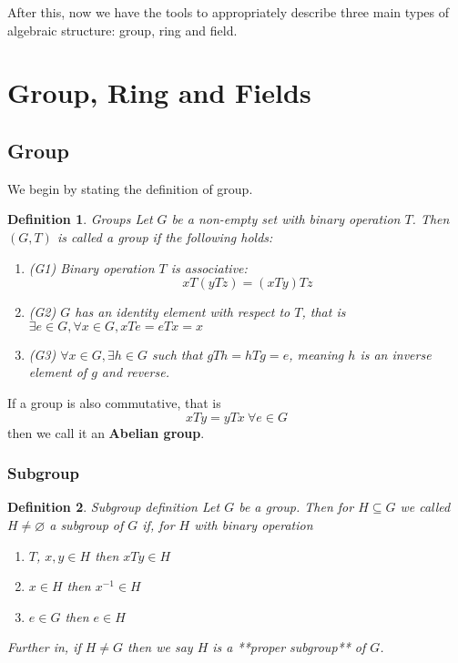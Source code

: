 \documentclass{book}
\newtheorem{Definition}{Definition}[section]
\numberwithin{identity}{subsection}
\numberwithin{Rule}{subsection}
\numberwithin{Theorem}{subsection}
\numberwithin{Definition}{subsection}
\begin{document}
After this, now we have the tools to appropriately describe three main types of algebraic structure: group, ring and field. 

\section{Group, Ring and Fields}
\subsection{Group}
We begin by stating the definition of group. 

\begin{Definition}
    Groups
Let $G$ be a non-empty set with binary operation $T$. Then $(G,T)$ is called a group if the following holds: 
\begin{enumerate}
    \item (G1) Binary operation $T$ is associative: $$xT(yTz)= (xTy)Tz$$
\item (G2) $G$ has an identity element with respect to $T$, that is $\exists e\in G, \forall x \in G, xTe = eTx = x$
\item (G3) $\forall x \in G, \exists h \in G$ such that $gTh=hTg=e$, meaning $h$ is an inverse element of $g$ and reverse. 
\end{enumerate}
\end{Definition}

If a group is also commutative, that is $$xTy = yTx\:\forall e \in G$$ then we call it an \textbf{Abelian group}. 

\subsubsection{Subgroup}

\begin{Definition}
    Subgroup definition
Let $G$ be a group. Then for $H\subseteq G$ we called $H \neq \varnothing$ a subgroup of $G$ if, for $H$ with binary operation 
\begin{enumerate}
    \item $T$, $x,y\in H$ then $xTy\in H$ 
    \item $x\in H$ then $x^{-1}\in H$ 
    \item $e\in G$ then $e\in H$
\end{enumerate}

Further in, if $H\neq G$ then we say $H$ is a **proper subgroup** of $G$.
\end{Definition}
\end{document}
